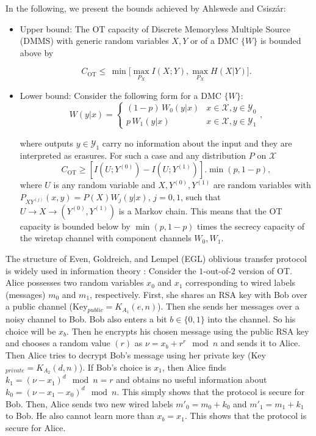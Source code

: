 \documentclass[runningheads]{llncs}
\newcommand{\parbreak}{ \vspace{0.3 em}}
\newcounter{protocol}
\begin{document}
\parbreak In the following, we present the bounds achieved by Ahlswede and Csiszár:

\begin{itemize}
    \item Upper bound: The OT capacity of Discrete Memoryless Multiple Source (DMMS) with generic random variables $X, Y$ or of a DMC $\lbrace W \rbrace$ is bounded above by 

    \begin{equation}\label{Upper}
        C_{\text{OT}}\leq\,\min \Big[\max_{P_X}I(X;Y), \max_{P_X}H(X|Y)\Big].
    \end{equation}
    
    \item Lower bound: Consider the following form for a DMC $\lbrace W \rbrace$:
    \[
    W(y|x)= \begin{cases}
             (1-p)\,W_0(y|x)  & x\in\mathcal{X}, y\in \mathcal{Y}_0\\
             p\,W_1(y|x)  & x\in\mathcal{X}, y\in \mathcal{Y}_1
       \end{cases},
    \]
   
    where outputs $y\in\mathcal{Y}_1$ carry no information about the input and they are interpreted as erasures.
    For such a case and any distribution $P$ on $\mathcal{X}$
    \begin{equation}\label{Lower}
        C_{\text{OT}}\geq \left[I(U;Y^{(0)})-I(U;Y^{(1)})\right].\min(p, 1-p),
    \end{equation}
    where $U$ is any random variable and $X, Y^{(0)}, Y^{(1)}$ are random variables with $P_{XY^{(j)}}(x,y) = P(X)W_{j}(y|x)$, $j=0, 1$, such that $U\rightarrow X \rightarrow (Y^{(0)}, Y^{(1)})$ is a Markov chain. This means that the OT capacity is bounded below by $\min (p, 1-p)$ times the secrecy capacity of the wiretap channel with component channels $W_0, W_1$. 
\end{itemize}
\parbreak
The structure of Even, Goldreich, and Lempel (EGL) oblivious transfer protocol \cite{EGL} is widely used in information theory \cite{Winter1, Winter3, Rudolf1, Imai}: Consider the $1$-out-of-$2$ version of OT. Alice possesses two random variables $x_0$ and $x_1$ corresponding to wired labels (messages) $m_0$ and $m_1$, respectively. First, she shares an RSA key with Bob over a public channel (Key$_{public}=K_{A_1}(e,n)$). Then she sends her messages over a noisy channel to Bob. Bob also enters a bit $b\in \lbrace 0,1 \rbrace$ into the channel. So his choice will be $x_b$. Then he encrypts his chosen message using the public RSA key and chooses a random value $(r)$ as $\nu=x_b+r^r \mod n$ and sends it to Alice. Then Alice tries to decrypt Bob's message using her private key (Key$_{private}=K_{A_2}(d,n)$). If Bob's choice is $x_1$, then Alice finds $k_1=(\nu-x_1)^d \mod n = r$ and obtains no useful information about $k_0=(\nu-x_1-x_0)^d \mod n$. This simply shows that the protocol is secure for Bob. Then, Alice sends two new wired labels $m'_0=m_0+k_0$ and  $m'_1=m_1+k_1$ to Bob. He also cannot learn more than $x_b=x_1$. This shows that the protocol is secure for Alice. 
\end{document}
